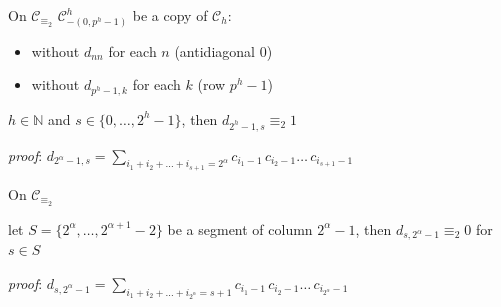 \documentclass[10pt,serif, professionalfont]{beamer}
\begin{document}
\begin{frame}{On $\mathcal{C}_{\equiv_{2}}$}
     $\mathcal{C}_{-(0,p^{h}-1)}^{h}$ be a copy of 
        $\mathcal{C}_{h}$:
        \begin{itemize}
            \item without $d_{nn}$ for each $n$ (antidiagonal $0$)
            \item without $d_{p^{h}-1,k}$ for each $k$ (row $p^{h}-1$)
        \end{itemize}
    \pause
    \begin{theorem}
        $h\in\mathbb{N}$ and $s\in\lbrace0,\ldots,2^{h}-1 \rbrace$, then 
            $d_{2^{h}-1,s} \equiv_{2} 1$
    \end{theorem}
    \emph{proof}: $ d_{2^{\alpha}-1,s} = \sum_{i_{1}+i_{2}+\ldots+i_{s+1}=2^{\alpha}}
                {c_{i_{1}-1}\,c_{i_{2}-1}\ldots\,c_{i_{s+1}-1}}$
    
\end{frame}

\begin{frame}{On $\mathcal{C}_{\equiv_{2}}$}
    \begin{theorem}
        let  $S=\lbrace2^{\alpha},\ldots,2^{\alpha+1}-2\rbrace$ be a segment of 
        column $2^{\alpha}-1$, then $d_{s,2^{\alpha}-1}\equiv_{2}0$ for $s\in S$
    \end{theorem}
    \emph{proof}: $d_{s, 2^{\alpha}-1} = \sum_{i_{1}+i_{2}+\ldots+i_{2^{\alpha}}=s+1}
            {c_{i_{1}-1}\,c_{i_{2}-1}\ldots\,c_{i_{2^{\alpha}}-1}}$
    
    
        
\end{frame}
\end{document}
